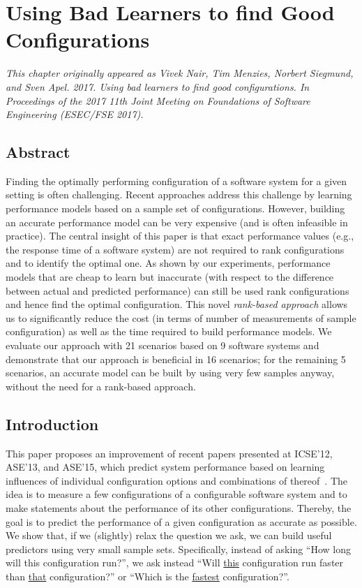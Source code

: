 \chapter{Using Bad Learners to find Good Configurations}
\label{chapter:rank}

\noindent\textit{This chapter originally appeared as 
Vivek Nair, Tim Menzies, Norbert Siegmund, and Sven Apel. 2017. Using bad learners to find good configurations. In Proceedings of the 2017 11th Joint Meeting on Foundations of Software Engineering (ESEC/FSE 2017).}


\section{Abstract}

 Finding the optimally performing configuration of a software system for a given setting is often challenging. Recent approaches address this challenge by learning performance models based on a sample set of configurations.
 However, building an accurate performance model can be very expensive (and is often infeasible in practice). 
The central  insight of this paper is that   
exact performance values (e.g., the response time of a software system) are not required to rank  configurations and to identify the optimal one. 
As shown by our experiments, performance models that are cheap to learn but inaccurate (with respect to the difference between actual and predicted performance) can still be used rank configurations and hence find the optimal configuration. This novel \emph{rank-based approach} allows us to significantly reduce the cost (in terms of number of measurements of sample configuration) as well as the time required to build performance models. We evaluate our approach with 21 scenarios based on 9 software systems and demonstrate that our approach is beneficial in 16 scenarios; for the remaining 5 scenarios, an accurate model can be built by using very few samples anyway, without the need for a rank-based approach.




\section{Introduction}
This paper proposes an improvement of recent papers presented at ICSE'12, ASE'13, and ASE'15, which predict system performance based on learning influences of individual configuration options and combinations of thereof~\cite{siegmund2012predicting,guo2013variability,sarkar2015cost}. The idea is to measure a few configurations of a configurable software system and to make statements about the performance of its other configurations. Thereby, the goal is to predict the performance of a given configuration as accurate as possible.
We show that, if we (slightly) relax the
question we ask, we can build useful predictors using very small sample sets. Specifically,
instead of asking ``How long will this configuration run?'', we
ask instead ``Will \underline{this} configuration run faster than \underline{that} configuration?'' or ``Which is the \underline{fastest} configuration?''. 


